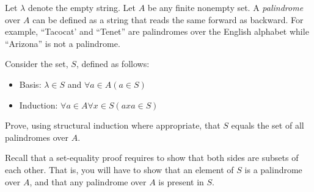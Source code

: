 \documentclass[a4paper]{exam}
\theoremstyle{claim}
\begin{document}
\begin{questions}
  \question Let $\lambda$ denote the empty string. Let $A$ be any finite nonempty set. A \textit{palindrome} over $A$ can be defined as a string that reads the same forward as backward. For example, ``Tacocat' and ``Tenet'' are palindromes over the English alphabet while ``Arizona'' is not a palindrome.

  Consider the set, $S$, defined as follows:
  \begin{itemize}
  \item Basis: $\lambda \in S$ and $\forall a \in A (a \in S)$
  \item Induction: $\forall a \in A\forall x \in S (axa \in S)$
  \end{itemize}

  Prove, using structural induction where appropriate, that $S$ equals the set of all palindromes over $A$.

  Recall that a set-equality proof requires to show that both sides are subsets of each other. That is, you will have to show that an element of $S$ is a palindrome over $A$, and that any palindrome over $A$ is present in $S$.


   

\end{questions}
\end{document}

